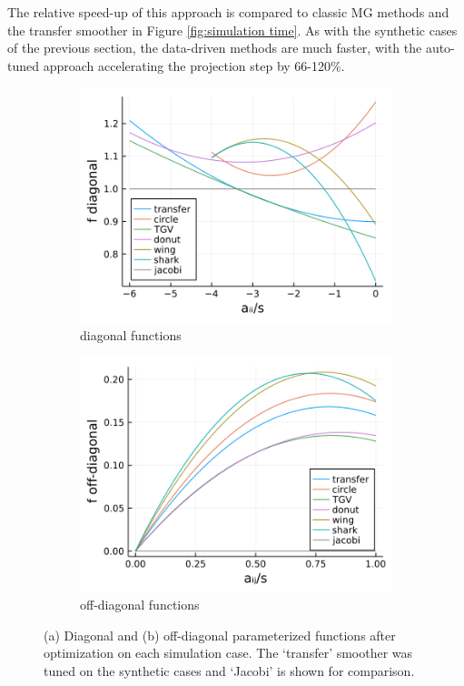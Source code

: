 \documentclass[review]{elsarticle}
\begin{document}
The relative speed-up of this approach is compared to classic MG methods and the transfer smoother in Figure \ref{fig:simulation time}. As with the synthetic cases of the previous section, the data-driven methods are much faster, with the auto-tuned approach accelerating the projection step by 66-120\%.

\begin{figure}
    \centering
    \begin{subfigure}[b]{0.47\textwidth}
        \centering
        \includegraphics[width=\textwidth]{figures/diag_fun.png}
        \caption{diagonal functions}
    \end{subfigure}
    \hfill
    \begin{subfigure}[b]{0.47\textwidth}
        \centering
        \includegraphics[width=\textwidth]{figures/lower_fun.png}
        \caption{off-diagonal functions}
    \end{subfigure}
        \caption{(a) Diagonal and (b) off-diagonal parameterized functions after optimization on each simulation case. The `transfer' smoother was tuned on the synthetic cases and `Jacobi' is shown for comparison.}
        \label{fig:tuned inverse}
\end{figure}
\end{document}
